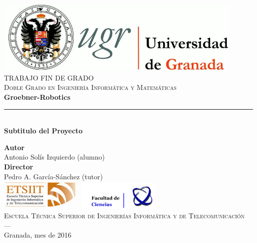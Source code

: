 \begin{titlepage}
 
 
\newlength{\centeroffset}
\setlength{\centeroffset}{-0.5\oddsidemargin}
\addtolength{\centeroffset}{0.5\evensidemargin}
\thispagestyle{empty}

\noindent\hspace*{\centeroffset}\begin{minipage}{\textwidth}

\centering
\includegraphics[width=0.9\textwidth]{imagenes/logo_ugr.jpg}\\[1.4cm]

\textsc{ \Large TRABAJO FIN DE GRADO\\[0.2cm]}
\textsc{ Doble Grado en Ingeniería Informática y Matemáticas}\\[1cm]
% 
{\Huge\bfseries Groebner-Robotics\\
}
\noindent\rule[-1ex]{\textwidth}{3pt}\\[3.5ex]
{\large\bfseries Subtitulo del Proyecto}
\end{minipage}

\vspace{2.5cm}
\noindent\hspace*{\centeroffset}\begin{minipage}{\textwidth}
\centering

\textbf{Autor}\\ {Antonio Solís Izquierdo (alumno)}\\[2.5ex]
\textbf{Director}\\
{Pedro A. García-Sánchez (tutor)}\\[2cm]

\includegraphics[width=0.3\textwidth]{imagenes/etsiit_logo.png}
\includegraphics[width=0.3\textwidth]{imagenes/fciencias_logo.jpg}\\[1cm]
\textsc{Escuela Técnica Superior de Ingenierías Informática y de Telecomunicación}\\
\textsc{---}\\
Granada, mes de 2016
\end{minipage}
\end{titlepage}


